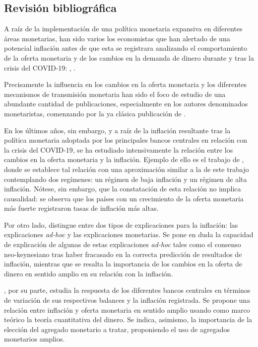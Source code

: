 \documentclass[titlepage, 12pt]{article}
\begin{document}
\subsection{Revisión bibliográfica}

A raíz de la implementación de una política monetaria expansiva en diferentes áreas monetarias, han sido varios los economistas que han alertado de una potencial inflación antes de que esta se registrara analizando el comportamiento de la oferta monetaria y de los cambios en la demanda de dinero durante y tras la crisis del COVID-19: \cite{castaneda2020}, \cite{congdon2020}.

Precisamente la influencia en los cambios en la oferta monetaria y los diferentes mecanismos de transmisión monetaria han sido el foco de estudio de una abundante cantidad de publicaciones, especialmente en los autores denominados monetaristas, comenzando por la ya clásica publicación de \cite{friedman1956}.

En los últimos años, sin embargo, y a raíz de la inflación resultante tras la política monetaria adoptada por los principales bancos centrales en relación con la crisis del COVID-19, se ha estudiado intensivamente la relación entre los cambios en la oferta monetaria y la inflación. Ejemplo de ello es el trabajo de \cite{borio2023}, donde se establece tal relación con una aproximación similar a la de este trabajo contemplando dos regímenes: un régimen de baja inflación y un régimen de alta inflación. Nótese, sin embargo, que la constatación de esta relación no implica causalidad: se observa que los países con un crecimiento de la oferta monetaria más fuerte registraron tasas de inflación más altas.

Por otro lado, \cite{greenwood2021} distingue entre dos tipos de explicaciones para la inflación: las explicaciones \textit{ad-hoc} y las explicaciones monetarias. Se pone en duda la capacidad de explicación de algunas de estas explicaciones \textit{ad-hoc} tales como el consenso neo-keynesiano tras haber fracasado en la correcta predicción de resultados de inflación, mientras que se resalta la importancia de los cambios en la oferta de dinero en sentido amplio en su relación con la inflación.

\cite{reynard2023}, por su parte, estudia la respuesta de los diferentes bancos centrales en términos de variación de sus respectivos balances y la inflación registrada. Se propone una relación entre inflación y oferta monetaria en sentido amplio usando como marco teórico la teoría cuantitativa del dinero. Se indica, asimismo, la importancia de la elección del agregado monetario a tratar, proponiendo el uso de agregados monetarios amplios.
\end{document}
